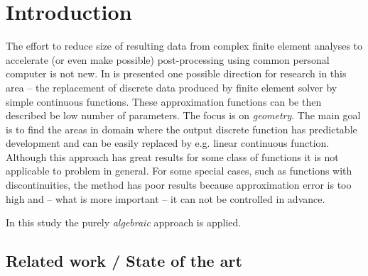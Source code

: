 \section{Introduction}
\label{sec:introduction}


The effort to reduce size of resulting data from complex finite element analyses to accelerate (or even make possible) post-processing using common personal computer is not new.
In \cite{Benes2015} is presented one possible direction for research in this area -- the replacement of discrete data produced by finite element solver by simple continuous functions. These approximation functions can be then described be low number of parameters. The focus is on \textit{geometry}. The main goal is to find the areas in domain where the output discrete function has predictable development and can be easily replaced by e.g. linear continuous function. Although this approach has great results for some class of functions it is not applicable to problem in general. For some special cases, such as functions with discontinuities, the method has poor results because approximation error is too high and -- what is more important -- it can not be controlled in advance.

In this study the purely \textit{algebraic} approach is applied.


\subsection{Related work / State of the art}